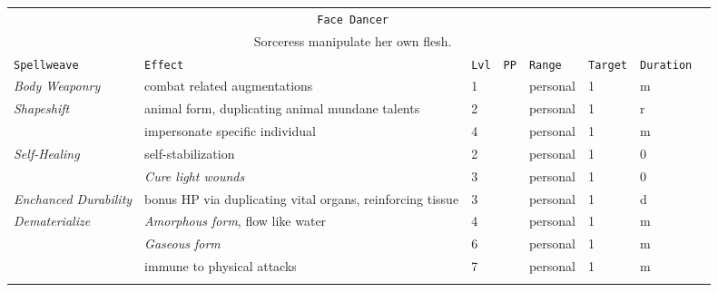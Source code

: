 \documentclass[10pt,a4paper]{article}
\begin{document}
\begin{table}[htbp!]
\begin{tabular}{llllllll}
  \multicolumn{7}{c}{\texttt{Face Dancer}}\\
  \multicolumn{7}{c}{Sorceress manipulate her own flesh.}\\
    \hline
 \texttt{Spellweave} & \texttt{Effect} & \texttt{Lvl} & \texttt{PP} & \texttt{Range} & \texttt{Target} & \texttt{Duration} \\
    \hline
    \multirow{1}{*}{\textit{Body Weaponry}} & combat related augmentations & 1 && personal & 1 & m\\
    \hline
    \multirow{1}{*}{\textit{Shapeshift}} & animal form, duplicating animal mundane talents & 2 && personal & 1 & r\\
										 & impersonate specific individual & 4 && personal & 1 & m\\    
    \hline
    \multirow{1}{*}{\textit{Self-Healing}} & self-stabilization & 2 && personal & 1 & 0\\
										   & \textit{Cure light wounds} & 3 && personal & 1 & 0\\    
    \hline
    \multirow{1}{*}{\textit{Enchanced Durability}} & bonus HP via duplicating vital organs, reinforcing tissue & 3 && personal & 1 & d \\
    \hline
    \multirow{1}{*}{\textit{Dematerialize}} & \textit{Amorphous form}, flow like water & 4 && personal & 1 & m\\
											& \textit{Gaseous form} & 6 && personal & 1 & m\\    
											& immune to physical attacks & 7 && personal & 1 & m\\
    &&&&&&\\
    
\end{tabular}
\end{table} 
\end{document}
